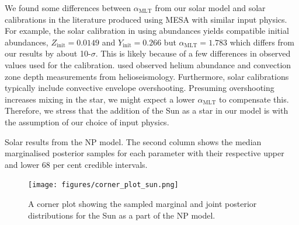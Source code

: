 \documentclass[fleqn,usenatbib]{mnras}
\newcommand{\mlt}{\ensuremath{{\alpha_\mathrm{MLT}}}}
\begin{document}
We found some differences between $\mlt$ from our solar model and solar calibrations in the literature produced using \textsc{MESA} with similar input physics. For example, the solar calibration in \citet{Stancliffe.Fossati.ea2016} using \citet{Asplund.Grevesse.ea2009} abundances yields compatible initial abundances, $Z_\mathrm{init} = 0.0149$ and $Y_\mathrm{init} = 0.266$ but $\mlt = 1.783$ which differs from our results by about 10-$\sigma$. This is likely because of a few differences in observed values used for the calibration. \citet{Stancliffe.Fossati.ea2016} used observed helium abundance and convection zone depth measurements from helioseismology. Furthermore, solar calibrations typically include convective envelope overshooting. Presuming overshooting increases mixing in the star, we might expect a lower $\mlt$ to compensate this. Therefore, we stress that the addition of the Sun as a star in our model is with the assumption of our choice of input physics.

\begin{table}
    \centering
    \caption{Solar results from the NP model. The second column shows the median marginalised posterior samples for each parameter with their respective upper and lower 68 per cent credible intervals.}
    \label{tab:sun-out}
    
\end{table}

\begin{figure}
    \centering
    \texttt{[image: figures/corner\_plot\_sun.png]}
    \caption{A corner plot showing the sampled marginal and joint posterior distributions for the Sun as a part of the NP model.}
    \label{fig:sun-results}
\end{figure}



\bsp	%
\label{lastpage}
\end{document}

